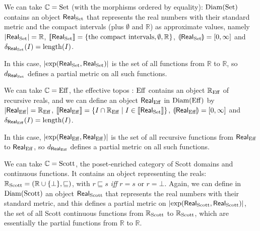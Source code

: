 \begin{example} We can take $\mathbb{C} = \operatorname{Set}$ (with the morphisms ordered by equality): $\operatorname{Diam}(\operatorname{Set})$ contains an object $\mathsf{Real}_{\operatorname{Set}}$ that represents the real numbers with their standard metric and the compact intervals (plus $\emptyset$ and $\mathbb{R}$) as approximate values, namely $\left\vert\mathsf{Real}_{\operatorname{Set}}\right\vert = \mathbb{R}$, $\llbracket \mathsf{Real}_{\operatorname{Set}} \rrbracket = \{ \text{the compact intervals}, \emptyset, \mathbb{R} \}$, $\llparenthesis \mathsf{Real}_{\operatorname{Set}} \rrparenthesis = [0,\infty]$ and $\delta_{\mathsf{Real}_{\operatorname{Set}}}(I) = \operatorname{length}(I)$.

In this case, $\left\vert\exp(\mathsf{Real}_{\operatorname{Set}}, \mathsf{Real}_{\operatorname{Set}})\right\vert$ is the set of all functions from $\mathbb{R}$ to $\mathbb{R}$, so $d_{\mathsf{Real}_{\operatorname{Set}}}$ defines a partial metric on all such functions.
\end{example}

\begin{example} We can take $\mathbb{C} = \operatorname{Eff}$, the effective topos \cite{hyland:effective-topos}: $\operatorname{Eff}$ contains an object $\mathbb{R}_{\operatorname{Eff}}$ of recursive reals, and we can define an object $\mathsf{Real}_{\operatorname{Eff}}$ in $\operatorname{Diam}(\operatorname{Eff})$ by $\left\vert\mathsf{Real}_{\operatorname{Eff}}\right\vert = \mathbb{R}_{\operatorname{Eff}}$, $\llbracket \mathsf{Real}_{\operatorname{Eff}} \rrbracket = \{ I \cap \mathbb{R}_{\operatorname{Eff}} \mid I \in \llbracket \mathsf{Real}_{\operatorname{Set}} \rrbracket \}$, $\llparenthesis \mathsf{Real}_{\operatorname{Eff}} \rrparenthesis = [0,\infty]$ and $\delta_{\mathsf{Real}_{\operatorname{Eff}}}(I) = \operatorname{length}(I)$.

In this case, $\left\vert\exp(\mathsf{Real}_{\operatorname{Eff}}, \mathsf{Real}_{\operatorname{Eff}})\right\vert$ is the set of all recursive functions from $\mathsf{Real}_{\operatorname{Eff}}$ to $\mathsf{Real}_{\operatorname{Eff}}$, so $d_{\mathsf{Real}_{\operatorname{Eff}}}$ defines a partial metric on all such functions.
\end{example}

\begin{example} We can take $\mathbb{C} = \operatorname{Scott}$, the poset-enriched category of Scott domains and continuous functions. It contains an object representing the reals: $\mathbb{R}_{\operatorname{Scott}} = (\mathbb{R} \cup \{ \bot \}, \sqsubseteq)$, with $r \sqsubseteq s$ \textit{iff} $r = s$ or $r = \bot$. Again, we can define in  $\operatorname{Diam}(\operatorname{Scott})$ an object $\mathsf{Real}_{\operatorname{Scott}}$ that represents the real numbers with their standard metric, and this defines a partial metric on $\left\vert\exp(\mathsf{Real}_{\operatorname{Scott}}, \mathsf{Real}_{\operatorname{Scott}})\right\vert$, the set of all Scott continuous functions from $\mathbb{R}_{\operatorname{Scott}}$ to $\mathbb{R}_{\operatorname{Scott}}$, which are essentially the partial functions from $\mathbb{R}$ to $\mathbb{R}$.
\end{example}

 